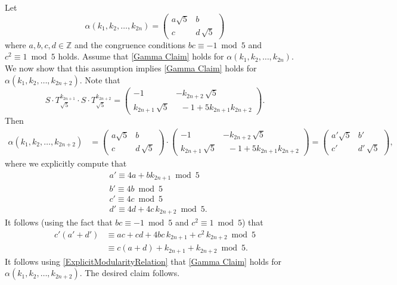 \documentclass[11pt]{amsart}
\numberwithin{equation}{section}
\theoremstyle{remark}
\begin{document}
Let 
$$
\alpha(k_1,k_2, \ldots, k_{2n}) = \begin{pmatrix} a\sqrt{5}&b\\
c  & d\,\sqrt{5}\end{pmatrix}$$
where $a,b,c,d\in\mathbb Z$ and the congruence conditions $bc\equiv -1\bmod{5} $ and $c^2 \equiv 1 \bmod 5$ holds. Assume that \eqref{Gamma Claim} holds for $\alpha(k_1, k_2, \ldots, k_{2n})$. We now show that this assumption implies \eqref{Gamma Claim} holds for $\alpha(k_1, k_2, \ldots, k_{2n+2})$. Note that
$$S \cdot T_{\sqrt{5}}^{k_{2n+1}} \cdot S \cdot T_{\sqrt{5}}^{k_{2n+2}}=
\begin{pmatrix}-1 & -k_{2n+2}\,\sqrt{5}\\
k_{2n+1}\,\sqrt{5}&\;\; -1+5k_{2n+1}k_{2n+2} \end{pmatrix}.$$
Then
\begin{align*}
\alpha(k_1, k_2, \ldots, k_{2n+2}) &=  \begin{pmatrix} a\sqrt{5}&b\\
c & d\,\sqrt{5}\end{pmatrix} \cdot \begin{pmatrix}-1 & -k_{2n+2}\,\sqrt{5}\\
k_{2n+1}\,\sqrt{5}&\;\; -1+5k_{2n+1}k_{2n+2} \end{pmatrix}= \begin{pmatrix} a'\sqrt{5}&b'\\
c'  & d'\,\sqrt{5}\end{pmatrix},
\end{align*}
where we explicitly compute that
\begin{align*} & a' \equiv 4a + b  k_{2n+1}   \bmod{5}\\
& b'\equiv 4b    \bmod{5}\\
& c'\equiv 4c    \bmod{5}\\
& d' \equiv 4d+4c \,k_{2n+2} \bmod{5}.
\end{align*}
It follows (using the fact that $bc\equiv-1\bmod{5}$ and $c^2\equiv 1\bmod{5}$) that 
\begin{align*}
c'(a'+d') &\equiv ac + cd +4bc\,k_{2n+1} + c^2\,k_{2n+2}  \bmod{5}\\
& \equiv c(a+d) + k_{2n+1} + k_{2n+2}  \bmod{5}.
\end{align*}
It follows using \eqref{ExplicitModularityRelation} that \eqref{Gamma Claim} holds for $\alpha(k_1, k_2, \ldots, k_{2n+2})$. The desired claim follows.\\
\end{document}
